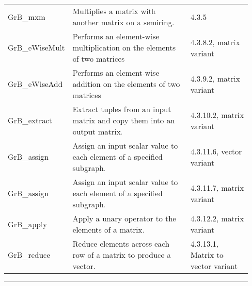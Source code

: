 \begin{table*}[h]
\begin{center}
\begin{tabular}{lll}
GrB\_mxm                     & Multiplies a matrix with another matrix on a semiring.                                       &  4.3.5 \\
GrB\_eWiseMult            & Performs an element-wise multiplication on the elements of two matrices        &  4.3.8.2, matrix variant  \\
GrB\_eWiseAdd            &  Performs an element-wise addition on the elements of two matrices                &  4.3.9.2, matrix variant \\
GrB\_extract                  & Extract tuples from an input matrix and copy them into an output matrix.          & 4.3.10.2, matrix variant \\
GrB\_assign                  & Assign an input scalar value to each element of a specified subgraph.               & 4.3.11.6, vector variant \\
GrB\_assign                  & Assign an input scalar value to each element of a specified subgraph.              &  4.3.11.7, matrix variant \\
GrB\_apply                   & Apply a unary operator to the elements of a matrix.                                            & 4.3.12.2, matrix variant \\
GrB\_reduce                  & Reduce elements across each row of a matrix to produce a vector.                  & 4.3.13.1, Matrix to vector variant \\
\end{tabular}
\end{center}
\hrule
\end{table*}

